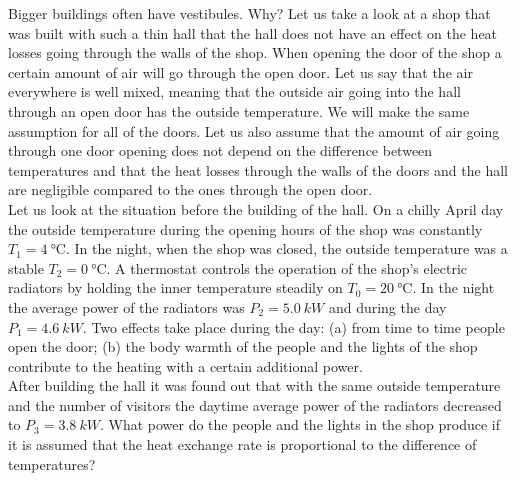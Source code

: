 \documentclass[11pt]{article}
\begin{document}
\probeng
Bigger buildings often have vestibules. Why? Let us take a look at a shop that was built with such a thin hall that the hall does not have an effect on the heat losses going through the walls of the shop. When opening the door of the shop a certain amount of air will go through the open door. Let us say that the air everywhere is well mixed, meaning that the outside air going into the hall through an open door has the outside temperature. We will make the same assumption for all of the doors. Let us also assume that the amount of air going through one door opening does not depend on the difference between temperatures and that the heat losses through the walls of the doors and the hall are negligible compared to the ones through the open door.\\
Let us look at the situation before the building of the hall. On a chilly April day the outside temperature during the opening hours of the shop was constantly $T_1=\SI{4}{\degreeCelsius}$. In the night, when the shop was closed, the outside temperature was a stable $T_2=\SI{0}{\degreeCelsius}$. A thermostat controls the operation of the shop’s electric radiators by holding the inner temperature steadily on $T_0=\SI{20}{\degreeCelsius}$. In the night the average power of the radiators was $P_2= \SI{5,0}{kW}$ and during the day $P_1=\SI{4,6}{kW}$. Two effects take place during the day: (a) from time to time people open the door; (b) the body warmth of the people and the lights of the shop contribute to the heating with a certain additional power.\\
After building the hall it was found out that with the same outside temperature and the number of visitors the daytime average power of the radiators decreased to $P_3=\SI{3,8}{kW}$. What power do the people and the lights in the shop produce if it is assumed that the heat exchange rate is proportional to the difference of temperatures?
\probend
\bigskip

\end{document}
